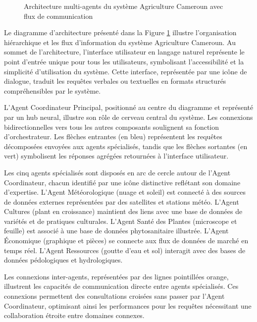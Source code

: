 \begin{figure}[h]
\centering
\caption{Architecture multi-agents du système Agriculture Cameroun avec flux de communication}
\label{fig:architecture}
\end{figure}

Le diagramme d'architecture présenté dans la Figure \ref{fig:architecture} illustre l'organisation hiérarchique et les flux d'information du système Agriculture Cameroun. Au sommet de l'architecture, l'interface utilisateur en langage naturel représente le point d'entrée unique pour tous les utilisateurs, symbolisant l'accessibilité et la simplicité d'utilisation du système. Cette interface, représentée par une icône de dialogue, traduit les requêtes verbales ou textuelles en formats structurés compréhensibles par le système.

L'Agent Coordinateur Principal, positionné au centre du diagramme et représenté par un hub neural, illustre son rôle de cerveau central du système. Les connexions bidirectionnelles vers tous les autres composants soulignent sa fonction d'orchestrateur. Les flèches entrantes (en bleu) représentent les requêtes décomposées envoyées aux agents spécialisés, tandis que les flèches sortantes (en vert) symbolisent les réponses agrégées retournées à l'interface utilisateur.

Les cinq agents spécialisés sont disposés en arc de cercle autour de l'Agent Coordinateur, chacun identifié par une icône distinctive reflétant son domaine d'expertise. L'Agent Météorologique (nuage et soleil) est connecté à des sources de données externes représentées par des satellites et stations météo. L'Agent Cultures (plant en croissance) maintient des liens avec une base de données de variétés et de pratiques culturales. L'Agent Santé des Plantes (microscope et feuille) est associé à une base de données phytosanitaire illustrée. L'Agent Économique (graphique et pièces) se connecte aux flux de données de marché en temps réel. L'Agent Ressources (goutte d'eau et sol) interagit avec des bases de données pédologiques et hydrologiques.

Les connexions inter-agents, représentées par des lignes pointillées orange, illustrent les capacités de communication directe entre agents spécialisés. Ces connexions permettent des consultations croisées sans passer par l'Agent Coordinateur, optimisant ainsi les performances pour les requêtes nécessitant une collaboration étroite entre domaines connexes.

